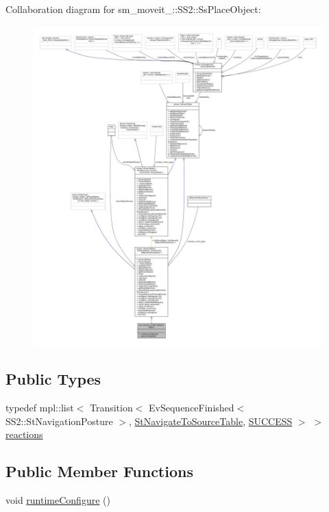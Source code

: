 Collaboration diagram for sm\+\_\+moveit\+\_\+:\+:S\+S2\+:\+:Ss\+Place\+Object\+:
\nopagebreak
\begin{figure}[H]
\begin{center}
\leavevmode
\includegraphics[width=350pt]{structsm__moveit__4_1_1SS2_1_1SsPlaceObject__coll__graph}
\end{center}
\end{figure}
\subsection*{Public Types}
\begin{DoxyCompactItemize}
\item 
typedef mpl\+::list$<$ Transition$<$ Ev\+Sequence\+Finished$<$ S\+S2\+::\+St\+Navigation\+Posture $>$, \hyperlink{structsm__moveit__4_1_1StNavigateToSourceTable}{St\+Navigate\+To\+Source\+Table}, \hyperlink{classSUCCESS}{S\+U\+C\+C\+E\+SS} $>$ $>$ \hyperlink{structsm__moveit__4_1_1SS2_1_1SsPlaceObject_a29affbd63b59aef96edfcc2bd38075e8}{reactions}
\end{DoxyCompactItemize}
\subsection*{Public Member Functions}
\begin{DoxyCompactItemize}
\item 
void \hyperlink{structsm__moveit__4_1_1SS2_1_1SsPlaceObject_a930b4228defad612e6fe391e78345819}{runtime\+Configure} ()
\end{DoxyCompactItemize}
